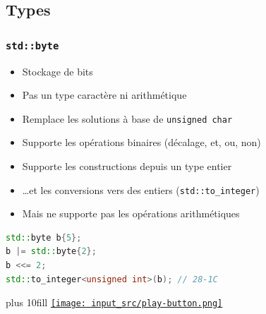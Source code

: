 \documentclass[C++.tex]{subfiles}
\begin{document}
\subsection*{Types}
\begin{frame}[fragile]
	\frametitle{\lstinline|std::byte|}
	\begin{itemize}
		\item Stockage de bits
		\item Pas un type caractère ni arithmétique
		\item Remplace les solutions à base de \lstinline|unsigned char|


		\item Supporte les opérations binaires (décalage, et, ou, non)
		\item Supporte les constructions depuis un type entier


		\item \ldots et les conversions vers des entiers (\lstinline|std::to_integer|)
		\item Mais ne supporte pas les opérations arithmétiques
	\end{itemize}

	\begin{lstlisting}[language=C++]
std::byte b{5};
b |= std::byte{2};
b <<= 2;
std::to_integer<unsigned int>(b); // 28-1C\end{lstlisting}

	\vskip 10mm plus 10fill
	\hfill
	\href{https://godbolt.org/#g:!((g:!((g:!((h:codeEditor,i:(filename:'1',fontScale:14,fontUsePx:'0',j:1,lang:c%2B%2B,selection:(endColumn:6,endLineNumber:16,positionColumn:6,positionLineNumber:16,selectionStartColumn:6,selectionStartLineNumber:16,startColumn:6,startLineNumber:16),source:'%23include+%3Ciostream%3E%0A%23include+%3Ccstddef%3E%0A%23include+%3Ciomanip%3E%0A%0Aint+main()%0A%7B%0A++std::byte+b%7B5%7D%3B%0A++std::cout+%3C%3C+std::hex+%3C%3C+std::setw(2)+%3C%3C+std::setfill(!'0!')+%3C%3C+std::to_integer%3Cunsigned+int%3E(b)+%3C%3C+!'%5Cn!'%3B%0A%0A++b+%7C%3D+std::byte%7B2%7D%3B%0A++std::cout+%3C%3C+std::hex+%3C%3C+std::setw(2)+%3C%3C+std::setfill(!'0!')+%3C%3C+std::to_integer%3Cunsigned+int%3E(b)+%3C%3C+!'%5Cn!'%3B%0A%0A++b+%3C%3C%3D+2%3B%0A++std::cout+%3C%3C+std::hex+%3C%3C+std::setw(2)+%3C%3C+std::setfill(!'0!')+%3C%3C+std::to_integer%3Cunsigned+int%3E(b)+%3C%3C+!'%5Cn!'%3B%0A%0A%23if+1%0A++b+%2B%3D+std::byte%7B2%7D%3B%0A%23endif%0A%7D%0A'),l:'5',n:'0',o:'C%2B%2B+source+%231',t:'0')),k:50,l:'4',n:'0',o:'',s:0,t:'0'),(g:!((h:executor,i:(argsPanelShown:'1',compilationPanelShown:'0',compiler:g112,compilerOutShown:'0',execArgs:'',execStdin:'',fontScale:14,fontUsePx:'0',j:1,lang:c%2B%2B,libs:!((name:boost,ver:'175')),options:'-std%3Dc%2B%2B17',source:1,stdinPanelShown:'1',tree:'1',wrap:'0'),l:'5',n:'0',o:'Executor+x86-64+gcc+11.2+(C%2B%2B,+Editor+%231)',t:'0')),header:(),k:50,l:'4',n:'0',o:'',s:0,t:'0')),l:'2',n:'0',o:'',t:'0')),version:4}{\texttt{[image: input\_src/play-button.png]}}
\end{frame}
\end{document}
